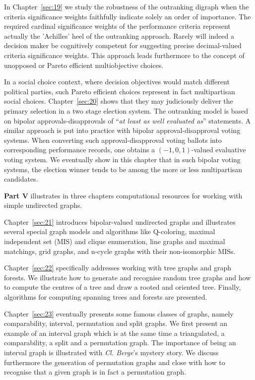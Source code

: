 In Chapter~\ref{sec:19} we study the robustness of the outranking digraph when the criteria significance weights faithfully indicate solely an order of importance. The required cardinal significance weights of the performance criteria represent actually the ’Achilles’ heel of the outranking approach. Rarely will indeed a decision maker be cognitively competent for suggesting precise decimal-valued criteria significance weights. This approach leads furthermore to the concept of unopposed or Pareto efficient multiobjective choices.

In a social choice context, where decision objectives would match different political parties, such Pareto efficient choices represent in fact multipartisan social choices. Chapter~\ref{sec:20} shows that they may judiciously deliver the primary selection in a two stage election system. The outranking model is based on bipolar approvals-disapprovals of ``\emph{at least as well evaluated as}'' statements. A similar approach is put into practice with bipolar approval-disapproval voting systems. When converting such approval-disapproval voting ballots into corresponding performance records, one obtains a $(-1,0,1)$-valued evaluative voting system. We eventually show in this chapter that in such bipolar voting systems, the election winner tends to be among the more or less multipartisan candidates.
\vspace{5pt}

\textbf{Part V} illustrates in three chapters computational resources for working with simple undirected graphs.

Chapter~\ref{sec:21} introduces bipolar-valued undirected graphs and illustrates several special graph models and algorithms like Q-coloring, maximal independent set (MIS) and clique enumeration, line graphs and maximal matchings, grid graphs, and n-cycle graphs with their non-isomorphic MISs.

Chapter~\ref{sec:22} specifically addresses working with tree graphs and graph forests. We illustrate how to generate and recognise random tree graphs and how to compute the centres of a tree and draw a rooted and oriented tree. Finally, algorithms for computing spanning trees and forests are presented.

Chapter~\ref{sec:23} eventually presents some famous classes of \Berge graphs, namely comparability, interval, permutation and split graphs. We first present an example of an interval graph which is at the same time a triangulated, a comparability, a split and a permutation graph. The importance of being an interval graph is illustrated with \emph{Cl. Berge}’s mystery story. We discuss furthermore the generation of permutation graphs and close with how to recognise that a given graph is in fact a permutation graph.


